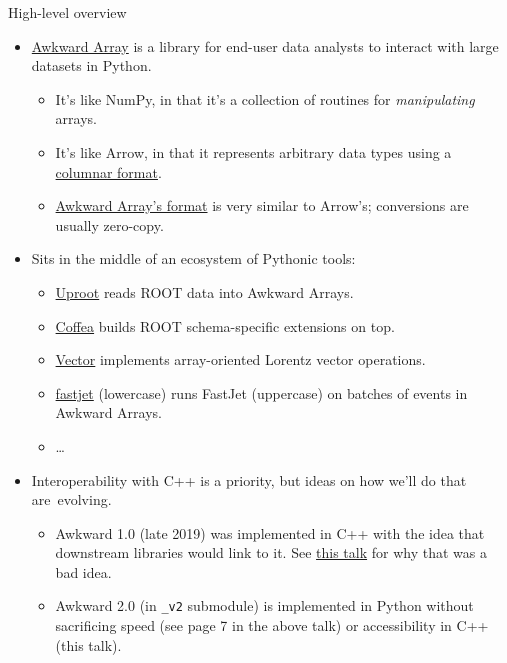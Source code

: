 \documentclass[aspectratio=169]{beamer}
\begin{document}
\begin{frame}{High-level overview}
\vspace{0.4 cm}
\begin{itemize}\setlength{\itemsep}{0.25 cm}
\item \textcolor{blue}{\href{https://inspirehep.net/literature/1806222}{Awkward Array}} is a library for end-user data analysts to interact with large datasets in Python.
\begin{itemize}
\item It's like NumPy, in that it's a collection of routines for {\it manipulating} arrays.
\item It's like Arrow, in that it represents arbitrary data types using a \textcolor{blue}{\href{https://arrow.apache.org/docs/format/Columnar.html}{columnar format}}.
\item \textcolor{blue}{\href{https://awkward-array.readthedocs.io/en/latest/ak.layout.Content.html}{Awkward Array's format}} is very similar to Arrow's; conversions are usually zero-copy.
\end{itemize}

\item<2-> Sits in the middle of an ecosystem of Pythonic tools:
\begin{itemize}
\item \textcolor{blue}{\href{https://pypi.org/project/uproot/}{Uproot}} reads ROOT data into Awkward Arrays.
\item \textcolor{blue}{\href{https://pypi.org/project/coffea/}{Coffea}} builds ROOT schema-specific extensions on top.
\item \textcolor{blue}{\href{https://pypi.org/project/vector/}{Vector}} implements array-oriented Lorentz vector operations.
\item \textcolor{blue}{\href{https://pypi.org/project/fastjet/}{fastjet}} (lowercase) runs FastJet (uppercase) on batches of events in Awkward Arrays.
\item \ldots
\end{itemize}

\item<3-> Interoperability with C++ is a priority, but ideas on how we'll do that \mbox{are evolving.\hspace{-1 cm}}
\begin{itemize}
\item Awkward 1.0 (late 2019) was implemented in C++ with the idea that downstream libraries would link to it. See \textcolor{blue}{\href{https://indico.cern.ch/event/855454/contributions/4605044/}{this talk}} for why that was a bad idea.
\item Awkward 2.0 (in \texttt{_v2} submodule) is implemented in Python without sacrificing speed (see page 7 in the above talk) or accessibility in C++ (this talk).
\end{itemize}

\end{itemize}
\end{frame}
\end{document}
